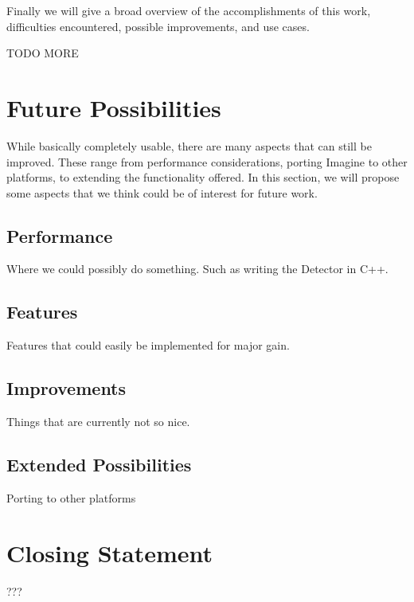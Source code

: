 Finally we will give a broad overview of the accomplishments of this work, difficulties encountered, possible improvements, and use cases.

TODO MORE

\section{Future Possibilities}

While basically completely usable, there are many aspects that can still be improved.
These range from performance considerations, porting Imagine to other platforms, to extending the functionality offered.
In this section, we will propose some aspects that we think could be of interest for future work.

\subsection{Performance}

Where we could possibly do something.
Such as writing the Detector in C++.

\subsection{Features}

Features that could easily be implemented for major gain.

\subsection{Improvements}

Things that are currently not so nice.

\subsection{Extended Possibilities}

Porting to other platforms

\section{Closing Statement}

???
